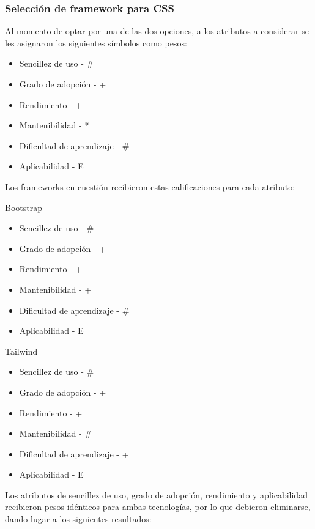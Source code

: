 \documentclass[twoside]{article}
\begin{document}
\subsubsection{Selección de framework para CSS}
Al momento de optar por una de las dos opciones, a los atributos a considerar se les asignaron los siguientes símbolos como pesos:
\begin{itemize}
    \item Sencillez de uso - \#
    \item Grado de adopción - +
    \item Rendimiento - +
    \item Mantenibilidad - *
    \item Dificultad de aprendizaje - \#
    \item Aplicabilidad - E
\end{itemize}
Los frameworks en cuestión recibieron estas calificaciones para cada atributo:

Bootstrap
\begin{itemize}
    \item Sencillez de uso - \#
    \item Grado de adopción - +
    \item Rendimiento - +
    \item Mantenibilidad - +
    \item Dificultad de aprendizaje - \#
    \item Aplicabilidad - E
\end{itemize}
Tailwind
\begin{itemize}
    \item Sencillez de uso - \#
    \item Grado de adopción - +
    \item Rendimiento - +
    \item Mantenibilidad - \#
    \item Dificultad de aprendizaje - +
    \item Aplicabilidad - E
\end{itemize}
Los atributos de sencillez de uso, grado de adopción, rendimiento y aplicabilidad recibieron pesos idénticos para ambas tecnologías, por lo que debieron eliminarse, dando lugar a los siguientes resultados:
\end{document}
